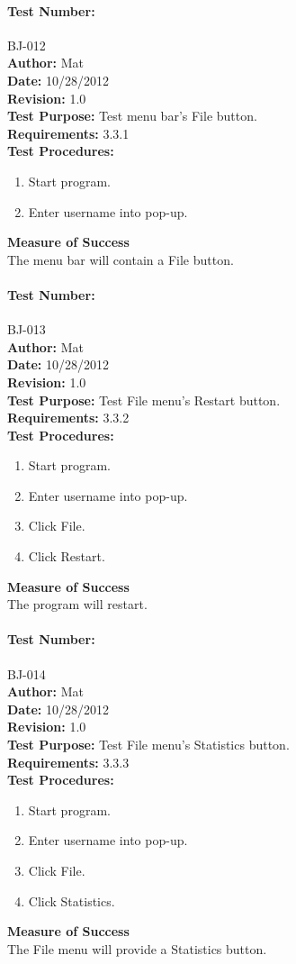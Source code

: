 \documentclass{article}
\begin{document}
\paragraph{Test Number:} BJ-012\\
\textbf{Author:} Mat\\
\textbf{Date:} 10/28/2012\\
\textbf{Revision:} 1.0\\
\textbf{Test Purpose:} Test menu bar's File button.\\
\textbf{Requirements:} 3.3.1 \\
\textbf{Test Procedures:} 
\begin{enumerate}
\item Start program.
\item Enter username into pop-up.
\end{enumerate}
\textbf{Measure of Success}\\The menu bar will contain a File button.
\paragraph{Test Number:} BJ-013\\
\textbf{Author:} Mat\\
\textbf{Date:} 10/28/2012\\
\textbf{Revision:} 1.0\\
\textbf{Test Purpose:} Test File menu's Restart button.\\
\textbf{Requirements:} 3.3.2 \\
\textbf{Test Procedures:} 
\begin{enumerate}
\item Start program.
\item Enter username into pop-up.
\item Click File.
\item Click Restart.
\end{enumerate}
\textbf{Measure of Success}\\The program will restart.
\paragraph{Test Number:} BJ-014\\
\textbf{Author:} Mat\\
\textbf{Date:} 10/28/2012\\
\textbf{Revision:} 1.0\\
\textbf{Test Purpose:} Test File menu's Statistics button.\\
\textbf{Requirements:} 3.3.3 \\
\textbf{Test Procedures:} 
\begin{enumerate}
\item Start program.
\item Enter username into pop-up.
\item Click File.
\item Click Statistics.
\end{enumerate}
\textbf{Measure of Success}\\The File menu will provide a Statistics button.
\end{document}
